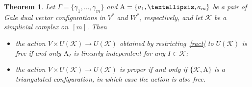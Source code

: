 \documentclass[a4paper]{amsart}
\newtheorem{theorem}{Theorem}[section]
\theoremstyle{definition}
\theoremstyle{remark}
\numberwithin{equation}{section}
\def\sK{\mathcal K}
\newcommand{\mb}[1]{{\textbf {\textit#1}}}
\newcommand{\<}{\langle}
\renewcommand{\>}{\rangle}
\begin{document}
\begin{theorem}\label{proper}
Let $\Gamma=\{\gamma_1,\ldots,\gamma_m\}$ and $\mathrm A=\{\mb a_1,\ldots,\mb a_m\}$ be a pair of Gale dual vector configurations in $V^*$ and $W^*$, respectively, and let $\sK$ be a simplicial complex on~$[m]$. Then
\begin{itemize}
\item[(1)] the action $V\times U(\sK)\to U(\sK)$ obtained by restricting~\eqref{ract} to $U(\sK)$ is free if and only $\mathrm A_I$ is linearly independent for any $I\in\sK$;

\item[(2)] the action $V\times U(\sK)\to U(\sK)$ is proper if and only if 
$\{\sK,\mathrm A\}$ is a triangulated configuration, in which case the action is also free.
\end{itemize}
\end{theorem}
\end{document}
